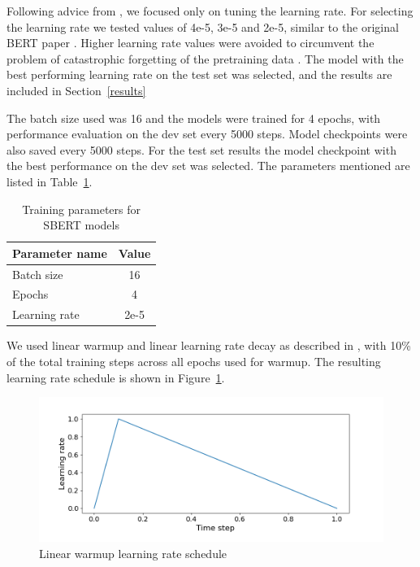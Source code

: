 \documentclass[10pt, a4paper]{article}
\begin{document}
Following advice from \citet{gkouti2024should}, we focused only on tuning the learning rate. For selecting the learning rate we tested values of 4e-5, 3e-5 and 2e-5, similar to the original BERT paper \cite{devlin2018bert}.
Higher learning rate values were avoided to circumvent the problem of catastrophic forgetting of the pretraining data \citep{sun2019fine}.
The model with the best performing learning rate on the test set was selected, and the results are included in Section~\ref{results}

The batch size used was 16 and the models were trained for 4 epochs, with performance evaluation on the dev set every 5000 steps. Model checkpoints were also saved every 5000 steps.
For the test set results the model checkpoint with the best performance on the dev set was selected. The parameters mentioned are listed in Table~\ref{tab:train-params}.

\begin{table}
\caption{Training parameters for SBERT models}
\label{tab:train-params}
\begin{center}
\begin{tabular}{lc}
\toprule
\textbf{Parameter name} & \textbf{Value} \\
\midrule
Batch size   & 16 \\
Epochs  & 4 \\
Learning rate & 2e-5 \\
\bottomrule
\end{tabular}
\end{center}
\end{table}

We used linear warmup and linear learning rate decay as described in \citet{devlin2018bert}, with 10\% of the total training steps across all epochs used for warmup.
The resulting learning rate schedule is shown in Figure~\ref{fig:warmup-schedule}.

\begin{figure}
\begin{center}
\includegraphics[width=\columnwidth]{figures/warmup-schedule.png}
\caption{Linear warmup learning rate schedule}
\label{fig:warmup-schedule}
\end{center}
\end{figure}
\end{document}
